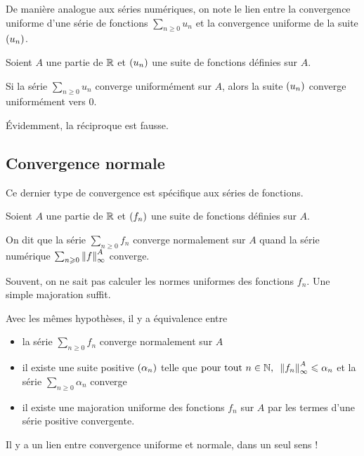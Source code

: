 De manière analogue aux séries numériques, on note le lien entre la convergence uniforme d'une série de fonctions \(\sum_{n\geq0}u_n\) et la convergence uniforme de la suite \(\left(u_n\right)\).

\begin{prop}
Soient \(A\) une partie de \(\mathbb{R}\) et \(\left(u_n\right)\) une suite de fonctions définies sur \(A\).

Si la série \(\sum_{n\geq0}u_n\) converge uniformément sur \(A\), alors la suite \(\left(u_n\right)\) converge uniformément vers \(0\).
\end{prop}

Évidemment, la réciproque est fausse.

\subsection{Convergence normale}

Ce dernier type de convergence est spécifique aux séries de fonctions.

\begin{defi}
Soient \(A\) une partie de \(\mathbb{R}\) et \(\left(f_n\right)\) une suite de fonctions définies sur \(A\).

On dit que la série \(\sum_{n\geq0}f_n\) converge normalement sur \(A\) quand la série numérique \(\sum_{n\geq0}\norme{f}_\infty^A\) converge.
\end{defi}

Souvent, on ne sait pas calculer les normes uniformes des fonctions \(f_n\). Une simple majoration suffit.

\begin{prop}
Avec les mêmes hypothèses, il y a équivalence entre

\begin{itemize}
    \item la série \(\sum_{n\geq0}f_n\) converge normalement sur \(A\) \\
    \item il existe une suite positive \(\left(\alpha_n\right)\) telle que \(\quantifs{\tpt n\in\N}\norme{f_n}_\infty^A\leq\alpha_n\) et la série \(\sum_{n\geq0}\alpha_n\) converge \\
    \item il existe une majoration uniforme des fonctions \(f_n\) sur \(A\) par les termes d'une série positive convergente.
\end{itemize}
\end{prop}

Il y a un lien entre convergence uniforme et normale, dans un seul sens !

